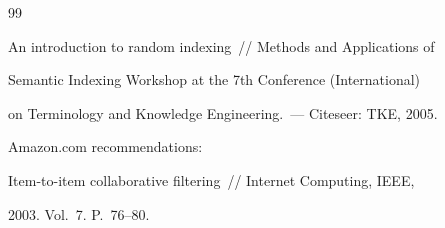 {{\begin{thebibliography}{99}
    \label{end\stat}









An introduction to random indexing~/\!\!/ Methods and Applications of 


Semantic Indexing Workshop at the 7th Conference (International)


on Terminology and Knowledge Engineering.~--- Citeseer: TKE, 2005.







 Amazon.com recommendations:


Item-to-item collaborative filtering~/\!\!/ Internet Computing, IEEE,


2003. Vol.~7. P.~76--80.











































\end{thebibliography}}}
